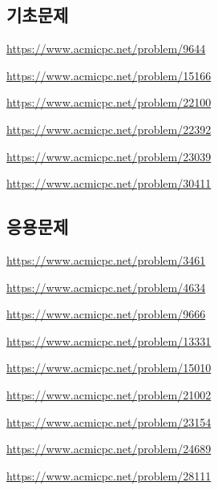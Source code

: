 \subsection{기초문제}
\begin{problem} \url{https://www.acmicpc.net/problem/9644} \end{problem}
\begin{problem} \url{https://www.acmicpc.net/problem/15166} \end{problem}
\begin{problem} \url{https://www.acmicpc.net/problem/22100} \end{problem}
\begin{problem} \url{https://www.acmicpc.net/problem/22392} \end{problem}
\begin{problem} \url{https://www.acmicpc.net/problem/23039} \end{problem}
\begin{problem} \url{https://www.acmicpc.net/problem/30411} \end{problem}

\subsection{응용문제}
\begin{problem} \url{https://www.acmicpc.net/problem/3461} \end{problem}
\begin{problem} \url{https://www.acmicpc.net/problem/4634} \end{problem}
\begin{problem} \url{https://www.acmicpc.net/problem/9666} \end{problem}
\begin{problem} \url{https://www.acmicpc.net/problem/13331} \end{problem}
\begin{problem} \url{https://www.acmicpc.net/problem/15010} \end{problem}
\begin{problem} \url{https://www.acmicpc.net/problem/21002} \end{problem}
\begin{problem} \url{https://www.acmicpc.net/problem/23154} \end{problem}
\begin{problem} \url{https://www.acmicpc.net/problem/24689} \end{problem}
\begin{problem} \url{https://www.acmicpc.net/problem/28111} \end{problem}

